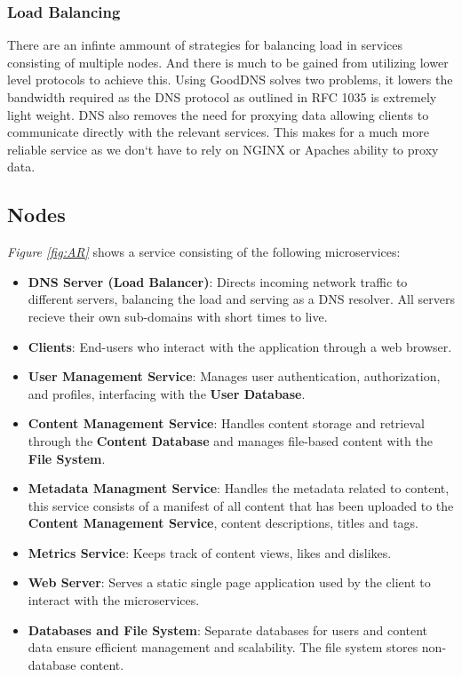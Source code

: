 \documentclass[12pt]{article}
\begin{document}
\subsubsection{Load Balancing}
There are an infinte ammount of strategies for balancing load in services consisting of multiple nodes.
And there is much to be gained from utilizing lower level protocols to achieve this. Using GoodDNS solves
two problems, it lowers the bandwidth required as the DNS protocol as outlined in RFC 1035 is extremely light weight.
DNS also removes the need for proxying data allowing clients to communicate directly with the relevant services.
This makes for a much more reliable service as we don`t have to rely on NGINX or Apaches ability to proxy data.

\subsection{Nodes}

\textit{Figure \ref{fig:AR}} shows a service consisting of the following microservices:

\begin{itemize}
    \item \textbf{DNS Server (Load Balancer)}: Directs incoming network traffic to different servers, 
    balancing the load and serving as a DNS resolver. All servers recieve their own sub-domains with short times to live.
    \item \textbf{Clients}: End-users who interact with the application through a web browser.
    \item \textbf{User Management Service}: Manages user authentication, authorization, and profiles, interfacing with the \textbf{User Database}.
    \item \textbf{Content Management Service}: Handles content storage and retrieval through the \textbf{Content Database} and manages file-based content with the \textbf{File System}.
    \item \textbf{Metadata Managment Service}: Handles the metadata related to content, this service consists of a manifest of all content that has been uploaded to the \textbf{Content Management Service}, content descriptions, titles and tags.
    \item \textbf{Metrics Service}: Keeps track of content views, likes and dislikes. 
    \item \textbf{Web Server}: Serves a static single page application used by the client to interact with the microservices.
    \item \textbf{Databases and File System}: Separate databases for users and content data ensure efficient management and scalability. The file system stores non-database content.
\end{itemize}
\end{document}

